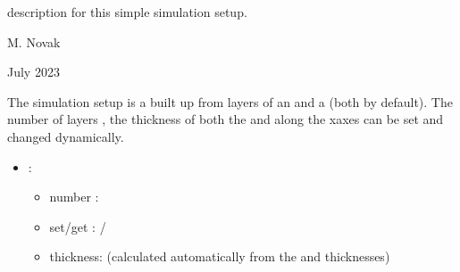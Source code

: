 \documentclass[letterpaper,10pt,english]{sphinxmanual}
\begin{document}
\begin{fulllineitems}
\label{\detokenize{Simulation/SimulationCodeDoc:_CPPv48Geometry}}
\pysigstartsignatures
\pysigstartmultiline
{}
\pysigstopmultiline
\pysigstopsignatures
\sphinxAtStartPar
{\hyperref[\detokenize{Simulation/SimulationCodeDoc:class_geometry}]{}} description for this simple simulation setup. 

\sphinxAtStartPar
\begin{description}
\sphinxAtStartPar
M. Novak 

\sphinxAtStartPar
July 2023

\end{description}


\sphinxAtStartPar
The simulation setup is a  built up from  layers of an  and a  (both by default). The number of layers , the thickness of both the  and  along the x\sphinxhyphen{}axes can be set and changed dynamically.

\sphinxAtStartPar
\begin{itemize}
\item {} 
\sphinxAtStartPar
{}:\begin{itemize}
\item {} 
\sphinxAtStartPar
number : 

\item {} 
\sphinxAtStartPar
set/get : /

\item {} 
\sphinxAtStartPar
thickness:  (calculated automatically from the  and  thicknesses)


\end{itemize}
\end{itemize}
\end{fulllineitems}
\end{document}
